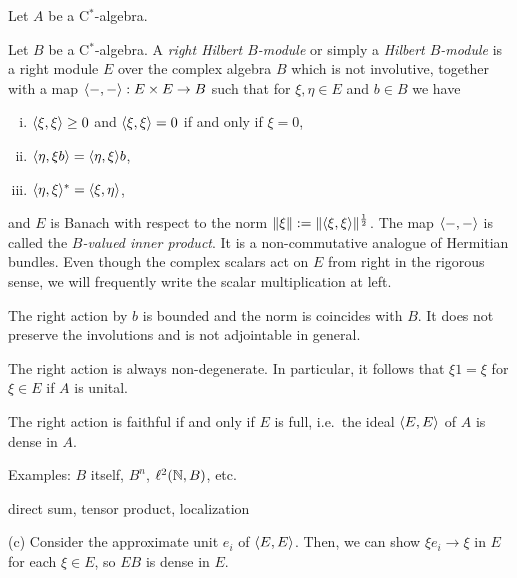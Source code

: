 \documentclass{../../large}
\begin{document}
\begin{prb}
Let $A$ be a C$^*$-algebra.
\end{prb}




\begin{prb}
Let $B$ be a C$^*$-algebra.
A \emph{right Hilbert $B$-module} or simply a \emph{Hilbert $B$-module} is a right module $E$ over the complex algebra $B$ which is not involutive, together with a map $\langle-,-\rangle:E\times E\to B$ such that for $\xi,\eta\in E$ and $b\in B$ we have
\begin{enumerate}[(i)]
\item $\langle\xi,\xi\rangle\ge0$ and $\langle\xi,\xi\rangle=0$ if and only if $\xi=0$,
\item $\langle\eta,\xi b\rangle=\langle\eta,\xi\rangle b$,
\item $\langle\eta,\xi\rangle^*=\langle\xi,\eta\rangle$,
\end{enumerate}
and $E$ is Banach with respect to the norm $\|\xi\|:=\|\langle\xi,\xi\rangle\|^{\frac12}$.
The map $\langle-,-\rangle$ is called the \emph{$B$-valued inner product}.
It is a non-commutative analogue of Hermitian bundles.
Even though the complex scalars act on $E$ from right in the rigorous sense, we will frequently write the scalar multiplication at left.
\begin{parts}
\item The right action by $b$ is bounded and the norm is coincides with $B$. It does not preserve the involutions and is not adjointable in general.
\item The right action is always non-degenerate. In particular, it follows that $\xi1=\xi$ for $\xi\in E$ if $A$ is unital.
\item The right action is faithful if and only if $E$ is full, i.e.~the ideal $\langle E,E\rangle$ of $A$ is dense in $A$.
\item Examples: $B$ itself, $B^n$, $\ell^2(\mathbb{N},B)$, etc.
\item direct sum, tensor product, localization
\end{parts}
\end{prb}
\begin{pf}

(c)
Consider the approximate unit $e_i$ of $\langle E,E\rangle$.
Then, we can show $\xi e_i\to\xi$ in $E$ for each $\xi\in E$, so $EB$ is dense in $E$.
\end{pf}
\end{document}
